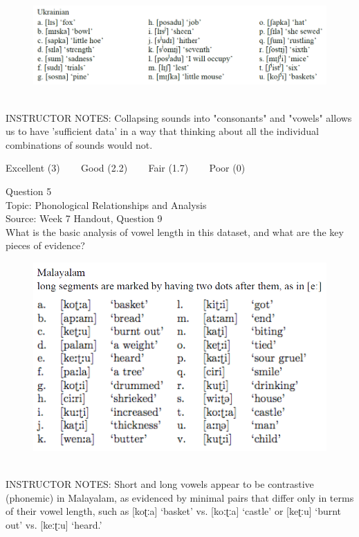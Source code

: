 \documentclass[12pt]{article}
\begin{document}
\begin{figure}[H]
\includegraphics{../images/ukrainian.png}
\end{figure}

~\\
INSTRUCTOR NOTES: Collapsing sounds into "consonants" and "vowels" allows us to have 'sufficient data' in a way that thinking about all the individual combinations of sounds would not.


\vfill
Excellent (3) ~~~ Good (2.2) ~~~ Fair (1.7) ~~~ Poor (0)
\newpage

{\large Question 5}\\

Topic: Phonological Relationships and Analysis\\
Source: Week 7 Handout, Question 9\\

What is the basic analysis of vowel length in this dataset, and what are the key pieces of evidence?\\

\begin{figure}[H]
\includegraphics{../images/malayalam.png}
\end{figure}

~\\
INSTRUCTOR NOTES: Short and long vowels appear to be contrastive (phonemic) in Malayalam, as evidenced by minimal pairs that differ only in terms of their vowel length, such as [koʈːa] ‘basket’ vs. [koːʈːa] ‘castle’ or [keʈːu] ‘burnt out’ vs. [keːʈːu] ‘heard.’
\end{document}
